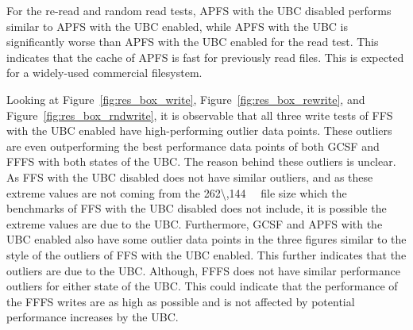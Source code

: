 For the \mbox{re-read} and random read tests, \gls{APFS} with the \gls{UBC} disabled performs similar to \gls{APFS} with the \gls{UBC} enabled, while \gls{APFS} with the \gls{UBC} is significantly worse than \gls{APFS} with the \gls{UBC} enabled for the read test. This indicates that the cache of \gls{APFS} is fast for previously read files. This is expected for a \mbox{widely-used} commercial filesystem.

Looking at Figure~\ref{fig:res_box_write}, Figure~\ref{fig:res_box_rewrite}, and Figure~\ref{fig:res_box_rndwrite}, it is observable that all three write tests of \gls{FFS} with the \gls{UBC} enabled have \mbox{high-performing} outlier data points. These outliers are even outperforming the best performance data points of both \gls{GCSF} and \gls{FFFS} with both states of the \gls{UBC}. The reason behind these outliers is unclear. As \gls{FFS} with the \gls{UBC} disabled does not have similar outliers, and as these extreme values are not coming from the \SI{262\,144}{\kilo\byte} file size which the benchmarks of \gls{FFS} with the \gls{UBC} disabled does not include, it is possible the extreme values are due to the \gls{UBC}. Furthermore, \gls{GCSF} and \gls{APFS} with the \gls{UBC} enabled also have some outlier data points in the three figures similar to the style of the outliers of \gls{FFS} with the \gls{UBC} enabled. This further indicates that the outliers are due to the \gls{UBC}. Although, \gls{FFFS} does not have similar performance outliers for either state of the \gls{UBC}. This could indicate that the performance of the \gls{FFFS} writes are as high as possible and is not affected by potential performance increases by the \gls{UBC}.


